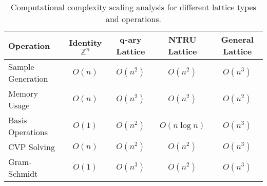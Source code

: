 
\begin{table}[ht]
\centering
\caption{Computational complexity scaling analysis for different lattice types and operations.}
\label{tab:scaling_analysis}
\begin{tabular}{l|c|c|c|c}
\toprule
Operation & Identity $\mathbb{Z}^n$ & q-ary Lattice & NTRU Lattice & General Lattice \\
\midrule
Sample Generation & $O(n)$ & $O(n^2)$ & $O(n^2)$ & $O(n^3)$ \\
Memory Usage & $O(n)$ & $O(n^2)$ & $O(n^2)$ & $O(n^2)$ \\
Basis Operations & $O(1)$ & $O(n^2)$ & $O(n \log n)$ & $O(n^3)$ \\
CVP Solving & $O(n)$ & $O(n^2)$ & $O(n^2)$ & $O(n^3)$ \\
Gram-Schmidt & $O(1)$ & $O(n^3)$ & $O(n^2)$ & $O(n^3)$ \\
\bottomrule
\end{tabular}
\end{table}
